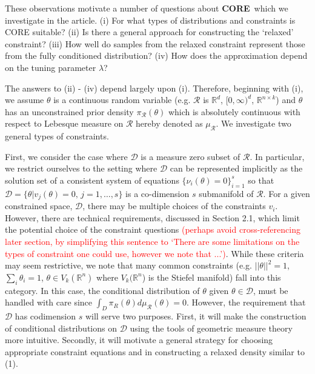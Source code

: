 \documentclass[12 point]{article}
\newcommand{\core}{\textbf{CORE}}
\newcommand{\leo}[1]{\textcolor{red}{ (#1)}}
\begin{document}
These observations motivate a number of questions about \core\, which we investigate in the article.  (i) For what types of distributions and constraints is CORE suitable? (ii) Is there a general approach for constructing the `relaxed' constraint? (iii) How well do samples from the relaxed constraint represent those from the fully conditioned distribution? (iv) How does the approximation depend on the tuning parameter $\lambda$? 

The answers to (ii) - (iv) depend largely upon (i).  Therefore, beginning with (i), we assume $\theta$ is a continuous random variable (e.g. $\mathcal{R}$ is $\mathbb{R}^d$, $[0,\infty)^d$, $\mathbb{R}^{n\times k}$) and $\theta$ has an unconstrained prior density $\pi_\mathcal{R}(\theta)$ which is absolutely continuous with respect to Lebesque measure on $\mathcal{R}$ hereby denoted as $\mu_\mathcal{R}$.  We investigate two general types of constraints. 

First, we consider the case where $\mathcal{D}$ is a measure zero subset of $\mathcal{R}$. In particular, we restrict ourselves to the setting where $\mathcal{D}$ can be represented implicitly as the solution set of a consistent system of equations $\{\nu_i(\theta) = 0\}_{i=1}^s$ so that $\mathcal{D} =\{\theta | v_j(\theta) =0, \, j = 1, \dots,s\}$ is a co-dimension $s$ submanifold of $\mathcal{R}$.  For a given constrained space, $\mathcal{D}$, there may be multiple choices of the constraints $v_i$. However, there are technical requirements, discussed in Section 2.1, which limit the potential choice of the constraint questions \leo{perhaps avoid cross-referencing
later section, by simplifying this sentence
to `There are some limitations on the types of constraint one could use,
however we note that ...'}. While these criteria may seem restrictive, we note that many common constraints (e.g. $||\theta||^2 = 1$, $\sum_i \theta_i = 1$, $\theta \in V_k(\mathbb{R}^n)$ where $V_k(\mathbb{R}^n$) is the Stiefel manifold) fall into this category.  In this case, the conditional distribution of $\theta$ given $\theta \in \mathcal{D}$, must be handled with care since $\int_D \pi_R(\theta) d\mu_\mathcal{R} (\theta) =0$.  However, the requirement that $\mathcal{D}$ has codimension $s$ will serve two purposes.  First, it will make the construction of conditional distributions on $\mathcal{D}$ using the tools of geometric measure theory more intuitive.  Secondly, it will motivate a general strategy for choosing appropriate constraint equations and in constructing a relaxed density similar to (1). 
\end{document}
